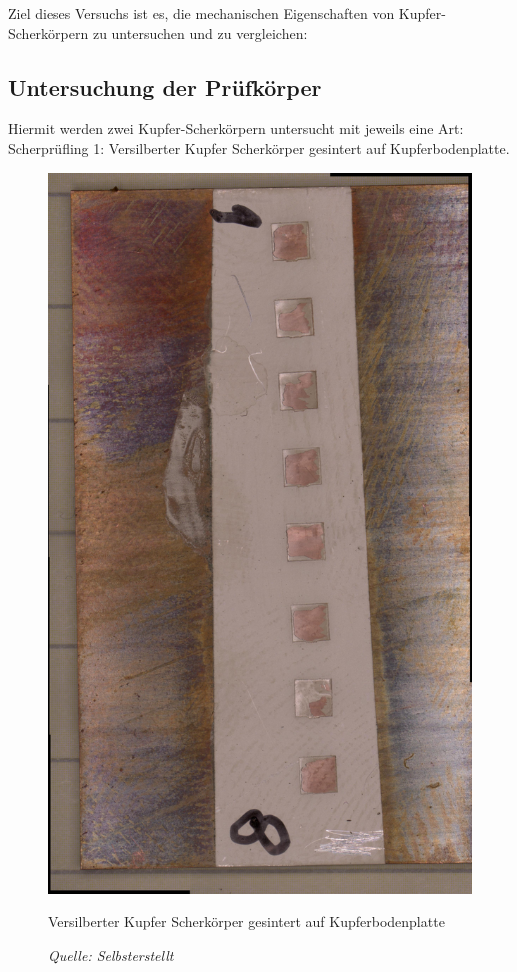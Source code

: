 Ziel dieses Versuchs ist es, die mechanischen Eigenschaften von Kupfer-Scherkörpern zu untersuchen und zu vergleichen:\\
\subsection{Untersuchung der Prüfkörper}
Hiermit werden zwei Kupfer-Scherkörpern untersucht mit jeweils eine Art:\\
Scherprüfling 1: Versilberter Kupfer Scherkörper gesintert auf Kupferbodenplatte.\\
\vspace{0.05cm}
\begin{figure}[h]
    \centering
    \includegraphics[scale=0.1, angle=90]{Bilder/Bodenplatte_Sintern_Gesamt.jpg}
    \caption{Versilberter Kupfer Scherkörper gesintert auf Kupferbodenplatte}
    \caption*{\textit{Quelle: Selbsterstellt}}
    \vspace{0.2cm}
    \label{Abb.2: Versilberter Kupfer Scherkörper gesintert auf Kupferbodenplatte} 
\end{figure}\\
